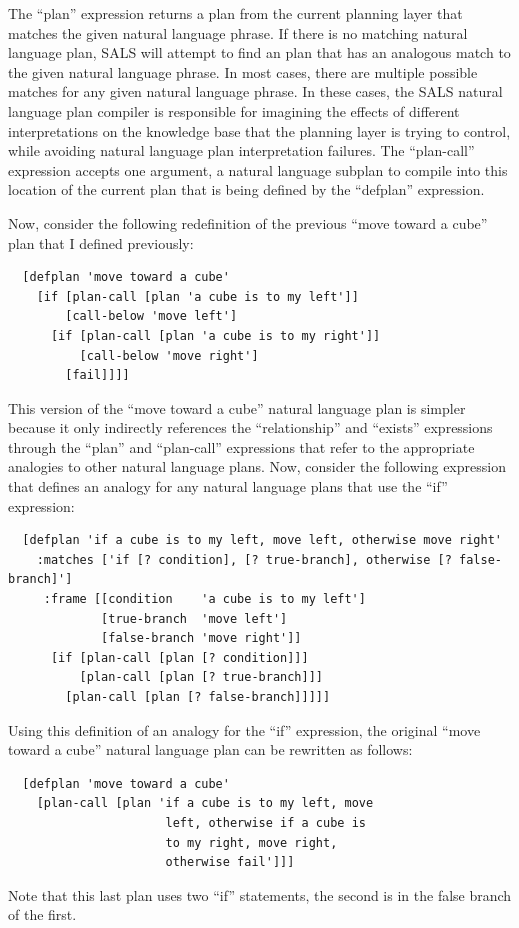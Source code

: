 The ``plan'' expression returns a plan from the current planning layer
that matches the given natural language phrase.  If there is no
matching natural language plan, SALS will attempt to find an plan that
has an analogous match to the given natural language phrase.  In most
cases, there are multiple possible matches for any given natural
language phrase.  In these cases, the SALS natural language plan
compiler is responsible for imagining the effects of different
interpretations on the knowledge base that the planning layer is
trying to control, while avoiding natural language plan interpretation
failures.  The ``plan-call'' expression accepts one argument, a
natural language subplan to compile into this location of the current
plan that is being defined by the ``defplan'' expression.

Now, consider the following redefinition of the previous ``move toward
a cube'' plan that I defined previously:
\begin{samepage}
\begin{Verbatim}
  [defplan 'move toward a cube'
    [if [plan-call [plan 'a cube is to my left']]
        [call-below 'move left']
      [if [plan-call [plan 'a cube is to my right']]
          [call-below 'move right']
        [fail]]]]
\end{Verbatim}
\end{samepage}
This version of the ``move toward a cube'' natural language plan is
simpler because it only indirectly references the ``relationship'' and
``exists'' expressions through the ``plan'' and ``plan-call''
expressions that refer to the appropriate analogies to other natural
language plans.  Now, consider the following expression that defines
an analogy for any natural language plans that use the ``if''
expression:
\begin{samepage}
\begin{Verbatim}
  [defplan 'if a cube is to my left, move left, otherwise move right'
    :matches ['if [? condition], [? true-branch], otherwise [? false-branch]']
     :frame [[condition    'a cube is to my left']
             [true-branch  'move left']
             [false-branch 'move right']]
      [if [plan-call [plan [? condition]]]
          [plan-call [plan [? true-branch]]]
        [plan-call [plan [? false-branch]]]]]
\end{Verbatim}
\end{samepage}
Using this definition of an analogy for the ``if'' expression, the
original ``move toward a cube'' natural language plan can be rewritten
as follows:
\begin{samepage}
\begin{Verbatim}
  [defplan 'move toward a cube'
    [plan-call [plan 'if a cube is to my left, move
                      left, otherwise if a cube is
                      to my right, move right,
                      otherwise fail']]]
\end{Verbatim}
\end{samepage}
Note that this last plan uses two ``if'' statements, the second is in
the false branch of the first.

